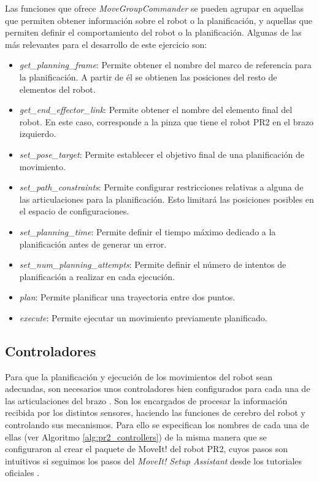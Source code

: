 \documentclass[12pt,spanish,chapterprefix, numbers=noenddot]{book}
\numberwithin{equation}{section}
\numberwithin{figure}{section}
\begin{document}
Las funciones que ofrece \textit{MoveGroupCommander} \cite{movegroup} se pueden agrupar en aquellas que permiten obtener información sobre el robot o la planificación, y aquellas que permiten definir el comportamiento del robot o la planificación. 
Algunas de las más relevantes para el desarrollo de este ejercicio son: 
\begin{itemize}
\item \textit{get\_planning\_frame}: Permite obtener el nombre del marco de referencia para la planificación. A partir de él se obtienen las posiciones del resto de elementos del robot. 
\item \textit{get\_end\_effector\_link}: Permite obtener el nombre del elemento final del robot. En este caso, corresponde a la pinza que tiene el robot PR2 en el brazo izquierdo. 
\item \textit{set\_pose\_target}: Permite establecer el objetivo final de una planificación de movimiento. 
\item \textit{set\_path\_constraints}: Permite configurar restricciones relativas a alguna de las articulaciones para la planificación. Esto limitará las posiciones posibles en el espacio de configuraciones.
\item \textit{set\_planning\_time}: Permite definir el tiempo máximo dedicado a la planificación antes de generar un error. 
\item \textit{set\_num\_planning\_attempts}: Permite definir el número de intentos de planificación a realizar en cada ejecución.  
\item \textit{plan}: Permite planificar una trayectoria entre dos puntos.  
\item \textit{execute}: Permite ejecutar un movimiento previamente planificado. 
\end{itemize}

\subsection{Controladores}
Para que la planificación y ejecución de los movimientos del robot sean adecuadas, son necesarios unos controladores bien configurados para cada una de las articulaciones del brazo \cite{pr2_controllers}. Son los encargados de procesar la información recibida por los distintos sensores, haciendo las funciones de cerebro del robot y controlando sus mecanismos.
Para ello se especifican los nombres de cada una de ellas (ver Algoritmo \ref{alg:pr2_controllers}) de la misma manera que se configuraron al crear el paquete de MoveIt! del robot PR2, cuyos pasos son intuitivos si seguimos los pasos del \textit{MoveIt! Setup Assistant} desde los tutoriales oficiales \cite{moveit_tutorials}.
\end{document}
